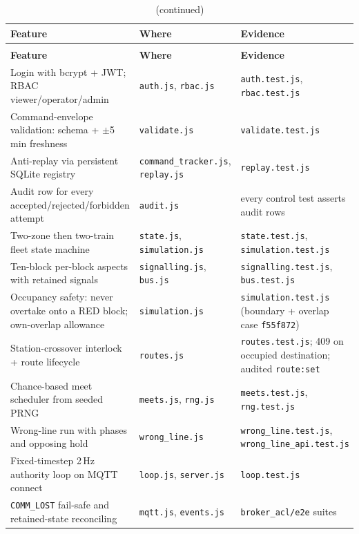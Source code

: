 \begin{longtable}{>{\raggedright}p{5.0cm} >{\raggedright\arraybackslash}p{5.6cm} >{\raggedright\arraybackslash}p{4.6cm}}
\caption{Backend features}\label{tab:backend-features}\\
\toprule
\textbf{Feature} & \textbf{Where} & \textbf{Evidence} \\
\midrule
\endfirsthead
\caption[]{(continued)}\\
\toprule
\textbf{Feature} & \textbf{Where} & \textbf{Evidence} \\
\midrule
\endhead
Login with bcrypt + JWT; RBAC viewer/operator/admin & \texttt{auth.js}, \texttt{rbac.js} & \texttt{auth.test.js}, \texttt{rbac.test.js} \\
Command-envelope validation: schema + $\pm$5\,min freshness & \texttt{validate.js} & \texttt{validate.test.js} \\
Anti-replay via persistent SQLite registry & \texttt{command\_tracker.js}, \texttt{replay.js} & \texttt{replay.test.js} \\
Audit row for every accepted/rejected/forbidden attempt & \texttt{audit.js} & every control test asserts audit rows \\
Two-zone then two-train fleet state machine & \texttt{state.js}, \texttt{simulation.js} & \texttt{state.test.js}, \texttt{simulation.test.js} \\
Ten-block per-block aspects with retained signals & \texttt{signalling.js}, \texttt{bus.js} & \texttt{signalling.test.js}, \texttt{bus.test.js} \\
Occupancy safety: never overtake onto a RED block; own-overlap allowance & \texttt{simulation.js} & \texttt{simulation.test.js} (boundary + overlap case \texttt{f55f872}) \\
Station-crossover interlock + route lifecycle & \texttt{routes.js} & \texttt{routes.test.js}; 409 on occupied destination; audited \texttt{route:set} \\
Chance-based meet scheduler from seeded PRNG & \texttt{meets.js}, \texttt{rng.js} & \texttt{meets.test.js}, \texttt{rng.test.js} \\
Wrong-line run with phases and opposing hold & \texttt{wrong\_line.js} & \texttt{wrong\_line.test.js}, \texttt{wrong\_line\_api.test.js} \\
Fixed-timestep 2\,Hz authority loop on MQTT connect & \texttt{loop.js}, \texttt{server.js} & \texttt{loop.test.js} \\
\texttt{COMM\_LOST} fail-safe and retained-state reconciling & \texttt{mqtt.js}, \texttt{events.js} & \texttt{broker\_acl/e2e} suites \\

\end{longtable}
